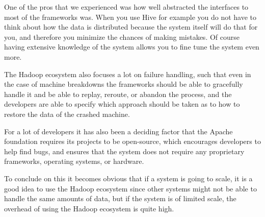 \newpar One of the pros that we experienced was how well abstracted the interfaces to most of the frameworks was. When you use Hive for example you do not have to think about how the data is distributed because the system itself will do that for you, and therefore you minimize the chances of making mistakes. Of course having extensive knowledge of the system allows you to fine tune the system even more.

\newpar The Hadoop ecosystem also focuses a lot on failure handling, such that even in the case of machine breakdowns the frameworks should be able to gracefully handle it and be able to replay, reroute, or abandon the process, and the developers are able to specify which approach should be taken as to how to restore the data of the crashed machine. 

\newpar For a lot of developers it has also been a deciding factor that the Apache foundation requires its projects to be open-source, which encourages developers to help find bugs, and ensures that the system does not require any proprietary frameworks, operating systems, or hardware.

\newpar To conclude on this it becomes obvious that if a system is going to scale, it is a good idea to use the Hadoop ecosystem since other systems might not be able to handle the same amounts of data, but if the system is of limited scale, the overhead of using the Hadoop ecosystem is quite high.
